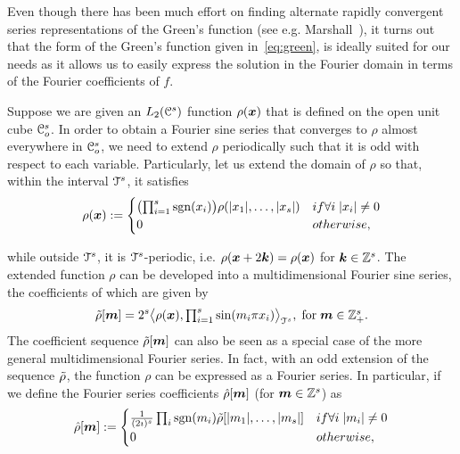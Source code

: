 Even though there has been much effort on finding alternate rapidly
convergent series representations of the Green's function (see
e.g. Marshall~\cite{marshall99}), it turns out that the form of the
Green's function given in~\eqref{eq:green}, is ideally suited
for our needs as it allows us to easily express the solution in the
Fourier domain in terms of the Fourier coefficients of $f$.

Suppose we are given an $L_2(\mathcal{C}^s)$ function $\rho(
\boldsymbol{x})$ that is
defined on the open unit cube $\mathcal{C}_o^s$. In order to obtain a
Fourier sine series that converges to $\rho$ almost everywhere in
$\mathcal{C}_o^s$, we need to extend $\rho$ periodically such that it is odd
with respect to each variable. Particularly, let us extend the domain
of $\rho$ so that, within the interval $\mathcal{T}^s$, it satisfies
{\small
\begin{equation}  
 \rho(\vect{x}) :=  
\begin{cases}
\bigl( \prod_{i=1}^s \sgn(x_i) \bigr)
\rho(|x_1|, \ldots, |x_s| ) &\mbox{if } \forall i \; |x_i| \ne 0 \\ 
0 &\mbox{otherwise},
\end{cases}
\label{eq:oddextension}
\end{equation}
}

while outside $\mathcal{T}^s$, it is $\mathcal{T}^s$-periodic, i.e. $\rho(\boldsymbol{x}
+ 2\boldsymbol{k}) = \rho(\boldsymbol{x})$ for $\boldsymbol{k} \in \mathbb{Z}^s$. The
extended function $\rho$ can be developed into a multidimensional
Fourier sine series, the coefficients of which are given by 
\begin{equation}
  \tilde{\rho}[\boldsymbol{m}] = 2^s \bigl \langle \rho(\boldsymbol{x}) , \textstyle{\prod_{i=1}^s}\sin(m_i\pi x_i) \bigr \rangle_{\mathcal{T}^s}, \; \text{for}\; \boldsymbol{m} \in \mathbb{Z}^s_+.
\end{equation}
The coefficient sequence $\tilde{\rho}[\boldsymbol{m}]$ can also be seen as a
special case of the more general multidimensional Fourier
series. In fact, with an odd extension of the sequence $\tilde{\rho}$, the
function $\rho$ can be expressed as a Fourier series. In particular,
if we define the Fourier series coefficients $\hat{\rho}[\boldsymbol{m}]$
(for $\boldsymbol{m} \in \mathbb{Z}^s$) as
{\small \begin{equation}
	\ft{\rho}[\vect{m}] := 
	\begin{cases}
	\frac{1}{(2\imath)^{s}} \prod_i \sgn(m_i)
	\st{\rho}[|m_1|,\ldots,|m_s|] &\mbox{if } \forall i \; |m_i| \ne 0 \\
	0 &\mbox{otherwise},
	\end{cases}
	\label{eq:oddFourierExtension}
\end{equation}}

